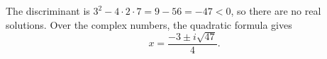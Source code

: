 The discriminant is $3^2-4\cdot2\cdot7=9-56=-47<0$, so there are no real solutions. Over the complex numbers, the quadratic formula gives
\[x=\boxed{\dfrac{-3\pm i\sqrt{47}}{4}}.\]
